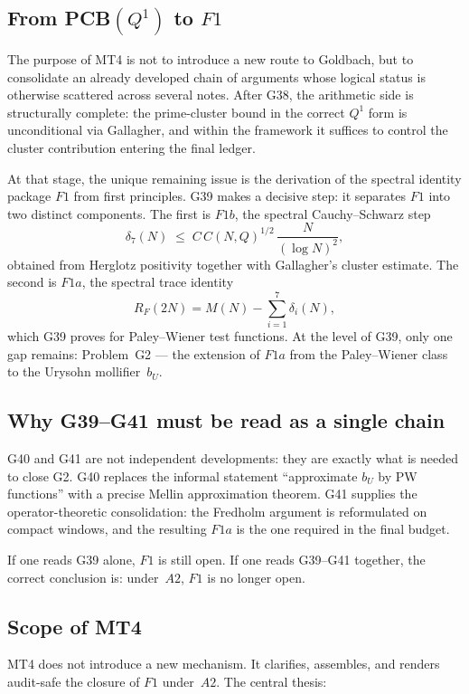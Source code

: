 \documentclass[11pt,a4paper]{article}
\begin{document}
\subsection{From PCB$(Q^1)$ to $F1$}

The purpose of MT4 is not to introduce a new route to Goldbach, but to consolidate an already developed chain of arguments whose logical status is otherwise scattered across several notes.  After G38, the arithmetic side is structurally complete: the prime-cluster bound in the correct $Q^1$ form is unconditional via Gallagher, and within the framework it suffices to control the cluster contribution entering the final ledger.

At that stage, the unique remaining issue is the derivation of the spectral identity package $F1$ from first principles.  G39 makes a decisive step: it separates $F1$ into two distinct components.  The first is $F1b$, the spectral Cauchy--Schwarz step
\[
\delta_7(N)\;\le\; C\, C(N,Q)^{1/2}\,\frac{N}{(\log N)^2},
\]
obtained from Herglotz positivity together with Gallagher's cluster estimate.  The second is $F1a$, the spectral trace identity
\[
R_F(2N)=M(N)-\sum_{i=1}^7 \delta_i(N),
\]
which G39 proves for Paley--Wiener test functions.  At the level of G39, only one gap remains: Problem~G2 --- the extension of $F1a$ from the Paley--Wiener class to the Urysohn mollifier~$b_U$.

\subsection{Why G39--G41 must be read as a single chain}

G40 and G41 are not independent developments: they are exactly what is needed to close G2.  G40 replaces the informal statement ``approximate $b_U$ by PW functions'' with a precise Mellin approximation theorem.  G41 supplies the operator-theoretic consolidation: the Fredholm argument is reformulated on compact windows, and the resulting $F1a$ is the one required in the final budget.

If one reads G39 alone, $F1$ is still open.  If one reads G39--G41 together, the correct conclusion is: under~$A2$, $F1$ is no longer open.

\subsection{Scope of MT4}

MT4 does not introduce a new mechanism.  It clarifies, assembles, and renders audit-safe the closure of $F1$ under~$A2$.  The central thesis:
\end{document}
